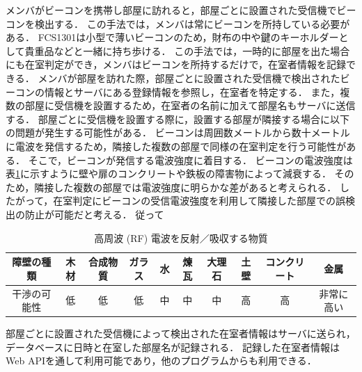 メンバがビーコンを携帯し部屋に訪れると，部屋ごとに設置された受信機でビーコンを検出する．
この手法では，メンバは常にビーコンを所持している必要がある．
FCS1301は小型で薄いビーコンのため，財布の中や鍵のキーホルダーとして貴重品などと一緒に持ち歩ける．
この手法では，一時的に部屋を出た場合にも在室判定ができ，メンバはビーコンを所持するだけで，在室者情報を記録できる．
メンバが部屋を訪れた際，部屋ごとに設置された受信機で検出されたビーコンの情報とサーバにある登録情報を参照し，在室者を特定する．
また，複数の部屋に受信機を設置するため，在室者の名前に加えて部屋名もサーバに送信する．
部屋ごとに受信機を設置する際に，設置する部屋が隣接する場合に以下の問題が発生する可能性がある．
ビーコンは周囲数メートルから数十メートルに電波を発信するため，隣接した複数の部屋で同様の在室判定を行う可能性がある．
そこで，ビーコンが発信する電波強度に着目する．
ビーコンの電波強度は表\ref{tb:rf}に示すように壁や扉のコンクリートや鉄板の障害物によって減衰する\cite{barrier}．
そのため，隣接した複数の部屋では電波強度に明らかな差があると考えられる．
したがって，在室判定にビーコンの受信電波強度を利用して隣接した部屋での誤検出の防止が可能だと考える．
従って

\begin{table}[H]
  \begin{center}
    \caption{高周波 (RF) 電波を反射／吸収する物質}
    \label{tb:rf}
    \begin{tabular}{|c||c|c|c|c|c|c|c|c|c|} \hline
      障壁の種類   & 木材 & 合成物質 & ガラス & 水 & 煉瓦 & 大理石 & 土壁 & コンクリート & 金属       \\ \hline
      干渉の可能性 & 低   & 低       & 低     & 中 & 中   & 中     & 高   & 高           & 非常に高い \\ \hline
    \end{tabular}
  \end{center}
\end{table}

部屋ごとに設置された受信機によって検出された在室者情報はサーバに送られ，データベースに日時と在室した部屋名が記録される．
記録した在室者情報はWeb APIを通して利用可能であり，他のプログラムからも利用できる．

